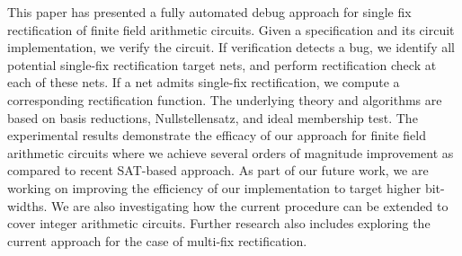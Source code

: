 This paper has presented a fully automated debug approach for single fix 
rectification of finite field arithmetic circuits. 
Given a specification and its circuit implementation, we verify the circuit. 
If verification detects a bug, we identify all potential single-fix rectification target nets, 
and perform rectification check at each of these nets. If a net admits single-fix rectification, 
we compute a corresponding rectification function. 
The underlying theory and algorithms are based on \Grobner basis reductions, Nullstellensatz, and ideal membership test.  
The experimental results demonstrate the efficacy of our approach for finite field 
arithmetic circuits where we achieve several orders of magnitude
improvement as compared to recent SAT-based approach. 
As part of our future work, we are working on improving the efficiency of our 
implementation to target higher bit-widths. We are also investigating how the 
current procedure can be extended to cover integer arithmetic circuits.
Further research also includes exploring the current approach for
the case of multi-fix rectification.  
